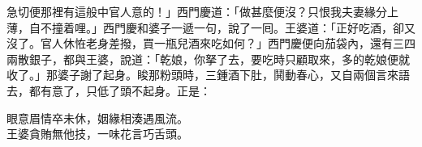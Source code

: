 急切便那裡有這般中官人意的！」{}西門慶道：「做甚麼便沒？只恨我夫妻緣分上薄，自不撞着哩。」西門慶和婆子一遞一句，說了一囘。王婆道：「正好吃酒，卻又沒了。官人休恠老身差撥，買一瓶兒酒來吃如何？」西門慶便向茄袋內，還有三四兩散銀子，都與王婆，說道：「乾娘，你拏了去，要吃時只顧取來，多的乾娘便就收了。」那婆子謝了起身。睃那粉頭時，三鍾酒下肚，鬨動春心，又自兩個言來語去，都有意了，只低了頭不起身。正是：

\begin{myquote} 
眼意眉情卒未休，姻緣相湊遇風流。\\王婆貪賄無他技，一味花言巧舌頭。
\end{myquote} 
 

